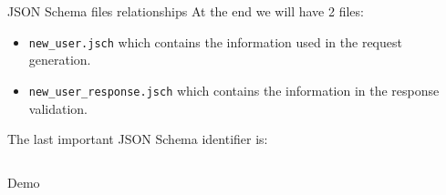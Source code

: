 \begin{frame}{JSON Schema files relationships}
  At the end we will have 2 files:
  \begin{itemize}
  \item \texttt{new\_user.jsch} which contains the information used in
    the request generation.
  \item \texttt{new\_user\_response.jsch} which contains the information
    in the response validation.
  \end{itemize}
  The last important JSON Schema identifier is:
  \inputminted{js}{./code/example1_targetSchema.jsch}
\end{frame}

\begin{frame}{}{}
  \begin{center}
    \vspace{15pt}
    {\Huge Demo}
  \end{center}
\end{frame}